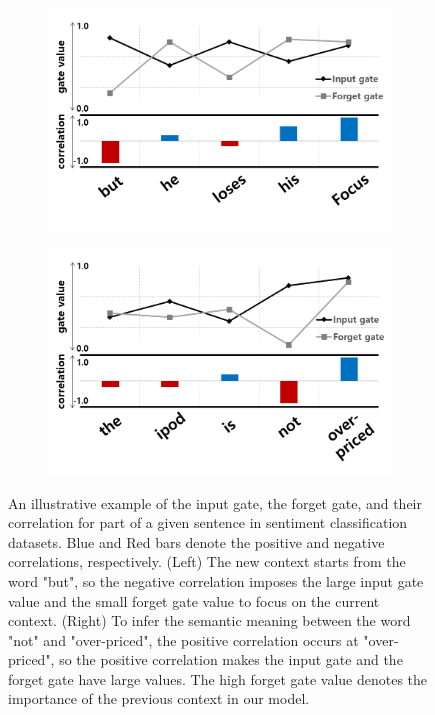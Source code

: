\documentclass[letterpaper]{article} %
\begin{document}
\begin{figure}
	\centering
	\begin{subfigure}[]{0.48\columnwidth}
		\includegraphics[width=\linewidth]{intro_fig2.png}
	\end{subfigure}
	\begin{subfigure}[]{0.48\columnwidth}
		\includegraphics[width=\linewidth]{intro_fig1.png}
	\end{subfigure}
	\caption{An illustrative example of the input gate, the forget gate, and their correlation for part of a given sentence in sentiment classification datasets. Blue and Red bars denote the positive and negative correlations, respectively.
		(Left) The new context starts from the word "but", so the negative correlation imposes the large input gate value and the small forget gate value to focus on the current context.
		(Right) To infer the semantic meaning between the word "not" and "over-priced", the positive correlation occurs at "over-priced", so the positive correlation makes the input gate and the forget gate have large values. The high forget gate value denotes the importance of the previous context in our model.}
	\label{fig:intro_example}
\end{figure}
\end{document}

